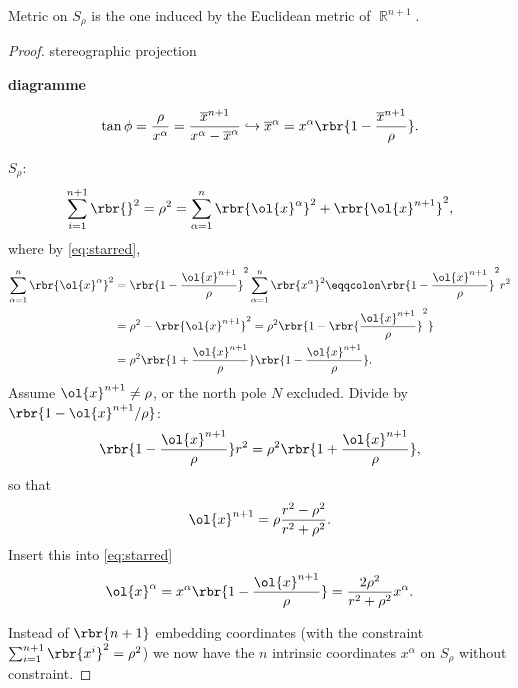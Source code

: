 Metric on $S_\rho$ is the one induced by the Euclidean metric of $\BbbR^{n+1}$.
\begin{proof}
stereographic projection

\textbf{diagramme}

\begin{equation}
\tan \phi = \frac{\rho}{x^\alpha} = \frac{\overline{x}^{n+1}}{x^\alpha - 
\overline{x}^\alpha} \hookrightarrow \overline{x}^\alpha = 
x^\alpha \rbr{1-\frac{\overline{x}^{n+1}}{\rho}}.
\label{eq:starred}
\end{equation}

$S_\rho$:
\begin{equation}
\sum_{i=1}^{n+1}\rbr{}^2 = \rho^2 = \sum_{\alpha = 1}^n\rbr{\ol{x}^\alpha}^2
+\rbr{\ol{x}^{n+1}}^2,
\end{equation}
where by \cref{eq:starred},
\begin{align}
\sum_{\alpha = 1}^n\rbr{\ol{x}^\alpha}^2 &=
\rbr{1-\frac{\ol{x}^{n+1}}{\rho}}^2 \sum_{\alpha=1}^n \rbr{x^\alpha}^2
\eqqcolon \rbr{1-\frac{\ol{x}^{n+1}}{\rho}}^2 r^2 \nonumber \\
&= \rho^2 - \rbr{\ol{x}^{n+1}}^2 = \rho^2 \rbr{1 -\rbr{\frac{\ol{x}^{n+1} 
}{\rho}}^2} \nonumber \\
&= \rho^2\rbr{1+\frac{\ol{x}^{n+1}}{\rho}} 
\rbr{1-\frac{\ol{x}^{n+1}}{\rho}}.
\end{align}
Assume $\ol{x}^{n+1} \neq \rho$, or the north pole $N$ excluded. Divide by
$\rbr{1-\ol{x}^{n+1}/\rho}$:
\begin{equation}
\rbr{1-\frac{\ol{x}^{n+1}}{\rho}}r^2 = \rho^2 \rbr{1+\frac{\ol{x}^{n+1}}{\rho}},
\end{equation}
so that
\begin{equation}
\ol{x}^{n+1} = \rho\frac{r^2-\rho^2}{r^2+\rho^2}.
\end{equation}
Insert this into \cref{eq:starred}
\begin{equation}
\ol{x}^\alpha = x^\alpha\rbr{1-\frac{\ol{x}^{n+1}}{\rho}} =
\frac{2\rho^2}{r^2+\rho^2}x^\alpha.
\end{equation}

Instead of $\rbr{n+1}$ embedding coordinates (with the constraint 
$\sum_{i=1}^{n+1}\rbr{x^i}^2 = \rho^2$) we now have the $n$ intrinsic 
coordinates $x^\alpha$ on $S_\rho$ without constraint.


\end{proof}
